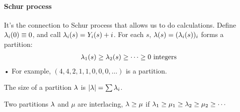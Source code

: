 \paragraph{Schur process} It's the connection to Schur process that allows us to do calculations.
Define $\lambda_i(0)\equiv 0$, and call $\lambda_i(s)=Y_i(s)+i$. For each $s$, $\lambda(s) = (\lambda_i(s))_i$ forms a partition:
\begin{align*}
\lambda_1(s)\ge \lambda_2(s) \ge\cdots \ge 0\text{ integers}
\end{align*}•
For example, $(4,4,2,1,1,0,0,0,\ldots)$ is a partition. 

The size of a partition $\lambda$ is $|\lambda|=\sum \lambda_i$. 

Two partitions $\lambda$ and $\mu$ are interlacing, $\lambda\ge \mu$ if $\lambda_1\ge \mu_1\ge \lambda_2\ge \mu_2\ge \cdots$


